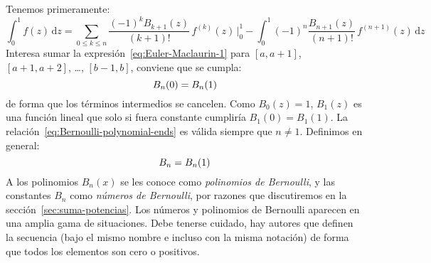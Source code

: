   Tenemos primeramente:
  \begin{equation}
    \label{eq:Euler-Maclaurin-1}
    \int_0^1 f(z) \, \mathrm{d} z
      = \sum_{0 \le k \le n}
	   \frac{(-1)^k B_{k + 1}(z)}{(k + 1)!} \, f^{(k)}(z)
	     \, \biggr|_0^1
	 - \int_0^1 (-1)^n \frac{B_{n + 1}(z)}{(n + 1)!} \,
			     f^{(n + 1)}(z) \, \mathrm{d} z
  \end{equation}
  Interesa sumar la expresión~\eqref{eq:Euler-Maclaurin-1}
  para \([a, a + 1]\), \([a + 1, a + 2]\), \ldots, \([b - 1, b]\),
  conviene que se cumpla:
  \begin{equation}
    \index{Bernoulli, polinomios de|textbfhy}
    \label{eq:Bernoulli-polynomial-ends}
    B_n(0)
      = B_n(1)
  \end{equation}
  de forma que los términos intermedios se cancelen.
  Como \(B_0(z) = 1\),
  \(B_1(z)\) es una función lineal
  que solo si fuera constante cumpliría \(B_1(0) = B_1(1)\).
  La relación~\eqref{eq:Bernoulli-polynomial-ends}
  es válida siempre que \(n \ne 1\).
  Definimos en general:
  \begin{equation}
    \index{Bernoulli, numeros de@Bernoulli, números de|textbfhy}
    \label{eq:Bernoulli-number-definition}
    B_n
      = B_n(1)
  \end{equation}
  A los polinomios \(B_n(x)\)
  se les conoce como \emph{polinomios de Bernoulli},
  y las constantes \(B_n\) como \emph{números de Bernoulli},
  por razones
  que discutiremos en la sección~\ref{sec:suma-potencias}.
  Los números y polinomios de Bernoulli
  aparecen en una amplia gama de situaciones.
  Debe tenerse cuidado,
  hay autores que definen la secuencia
  (bajo el mismo nombre e incluso con la misma notación)
  de forma que todos los elementos son cero o positivos.

